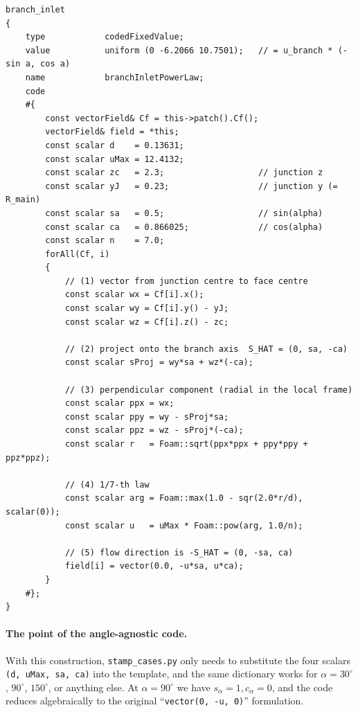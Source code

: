 \documentclass[11pt,a4paper]{article}
\begin{document}
\begin{lstlisting}[style=foamstyle,caption={\texttt{0/U} -- 30\textdegree{} branch (the angle-agnostic version)}]
branch_inlet
{
    type            codedFixedValue;
    value           uniform (0 -6.2066 10.7501);   // = u_branch * (-sin a, cos a)
    name            branchInletPowerLaw;
    code
    #{
        const vectorField& Cf = this->patch().Cf();
        vectorField& field = *this;
        const scalar d    = 0.13631;
        const scalar uMax = 12.4132;
        const scalar zc   = 2.3;                   // junction z
        const scalar yJ   = 0.23;                  // junction y (= R_main)
        const scalar sa   = 0.5;                   // sin(alpha)
        const scalar ca   = 0.866025;              // cos(alpha)
        const scalar n    = 7.0;
        forAll(Cf, i)
        {
            // (1) vector from junction centre to face centre
            const scalar wx = Cf[i].x();
            const scalar wy = Cf[i].y() - yJ;
            const scalar wz = Cf[i].z() - zc;

            // (2) project onto the branch axis  S_HAT = (0, sa, -ca)
            const scalar sProj = wy*sa + wz*(-ca);

            // (3) perpendicular component (radial in the local frame)
            const scalar ppx = wx;
            const scalar ppy = wy - sProj*sa;
            const scalar ppz = wz - sProj*(-ca);
            const scalar r   = Foam::sqrt(ppx*ppx + ppy*ppy + ppz*ppz);

            // (4) 1/7-th law
            const scalar arg = Foam::max(1.0 - sqr(2.0*r/d), scalar(0));
            const scalar u   = uMax * Foam::pow(arg, 1.0/n);

            // (5) flow direction is -S_HAT = (0, -sa, ca)
            field[i] = vector(0.0, -u*sa, u*ca);
        }
    #};
}
\end{lstlisting}

\paragraph{The point of the angle-agnostic code.}
With this construction, \texttt{stamp\_cases.py} only needs to
substitute the four scalars \texttt{(d, uMax, sa, ca)} into the
template, and the same dictionary works for $\alpha = 30^\circ$,
$90^\circ$, $150^\circ$, or anything else. At
$\alpha=90^\circ$ we have $s_\alpha=1, c_\alpha=0$, and the code
reduces algebraically to the original ``\texttt{vector(0, -u, 0)}''
formulation.
\end{document}

